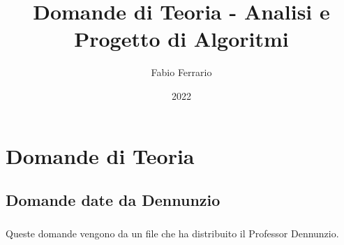 \documentclass[12pt, a4paper, openany]{book}
\begin{document}
\title{Domande di Teoria - Analisi e Progetto di Algoritmi}
\author{Fabio Ferrario}
\date{2022}
\maketitle
\tableofcontents

\chapter{Domande di Teoria}

	\section{Domande date da Dennunzio}
	\paragraph*{}Queste domande vengono da un file che ha distribuito il Professor Dennunzio.
\end{document}
